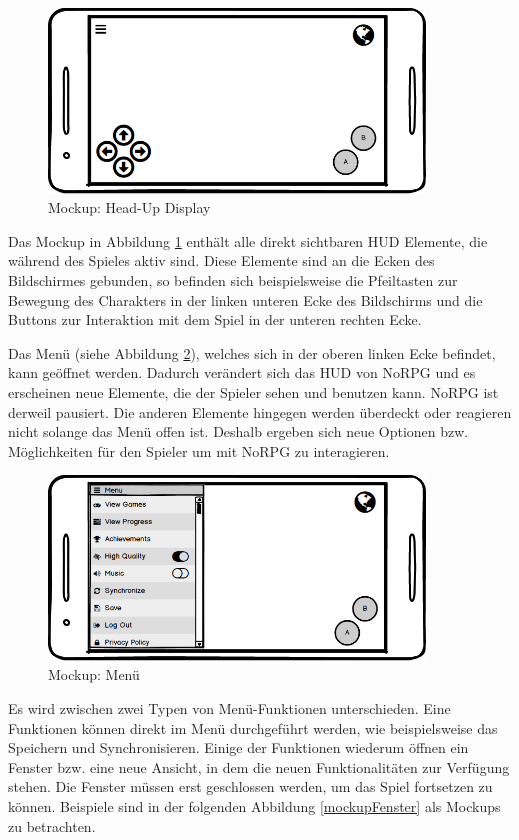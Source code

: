 			\begin{figure}[htbp]
				\centering 
				\label{mockupHUD}
				\includegraphics[width=10cm]{pics/HUD.png}
				\caption{Mockup: Head-Up Display}
			\end{figure}
			
			Das Mockup in Abbildung \ref{mockupHUD} enthält alle direkt sichtbaren \ac{HUD} Elemente, die während des Spieles aktiv sind. Diese Elemente sind an die Ecken des Bildschirmes gebunden, so befinden sich beispielsweise die Pfeiltasten zur Bewegung des Charakters in der linken unteren Ecke des Bildschirms und die Buttons zur Interaktion mit dem Spiel in der unteren rechten Ecke. 
			
			Das Menü (siehe Abbildung \ref{mockupMenu}), welches sich in der oberen linken Ecke befindet, kann geöffnet werden. Dadurch verändert sich das \ac{HUD} von NoRPG und es erscheinen neue Elemente, die der Spieler sehen und benutzen kann. NoRPG ist derweil pausiert. Die anderen Elemente hingegen werden überdeckt oder reagieren nicht solange das Menü offen ist. Deshalb ergeben sich neue Optionen bzw. Möglichkeiten für den Spieler um mit NoRPG zu interagieren.
			
			\begin{figure}[htbp]
				\centering 
				\label{mockupMenu}
				\includegraphics[width=10cm]{pics/Menu.png}
				\caption{Mockup: Menü}
			\end{figure}
			
			Es wird zwischen zwei Typen von Menü-Funktionen unterschieden. Eine Funktionen können direkt im Menü durchgeführt werden, wie beispielsweise das Speichern und Synchronisieren. Einige der Funktionen wiederum öffnen ein Fenster bzw. eine neue Ansicht, in dem die neuen Funktionalitäten zur Verfügung stehen. Die Fenster müssen erst geschlossen werden, um das Spiel fortsetzen zu können. Beispiele sind in der folgenden Abbildung \ref{mockupFenster} als Mockups zu betrachten.
			

